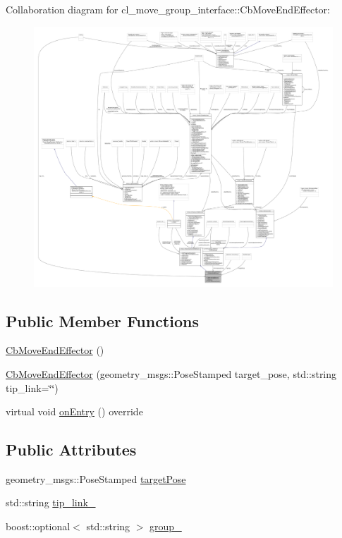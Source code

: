 Collaboration diagram for cl\+\_\+move\+\_\+group\+\_\+interface\+:\+:Cb\+Move\+End\+Effector\+:
\nopagebreak
\begin{figure}[H]
\begin{center}
\leavevmode
\includegraphics[width=350pt]{classcl__move__group__interface_1_1CbMoveEndEffector__coll__graph}
\end{center}
\end{figure}
\subsection*{Public Member Functions}
\begin{DoxyCompactItemize}
\item 
\hyperlink{classcl__move__group__interface_1_1CbMoveEndEffector_a5bcaaff082b7d8039a4f491b2797776e}{Cb\+Move\+End\+Effector} ()
\item 
\hyperlink{classcl__move__group__interface_1_1CbMoveEndEffector_a237d308fbeabd9c4bac82cf31b8fad33}{Cb\+Move\+End\+Effector} (geometry\+\_\+msgs\+::\+Pose\+Stamped target\+\_\+pose, std\+::string tip\+\_\+link=\char`\"{}\char`\"{})
\item 
virtual void \hyperlink{classcl__move__group__interface_1_1CbMoveEndEffector_a7e7c22ac6c5725bc95e9852c3f6d939d}{on\+Entry} () override
\end{DoxyCompactItemize}
\subsection*{Public Attributes}
\begin{DoxyCompactItemize}
\item 
geometry\+\_\+msgs\+::\+Pose\+Stamped \hyperlink{classcl__move__group__interface_1_1CbMoveEndEffector_ab0d0c060e52c6f09a6af727e6e954064}{target\+Pose}
\item 
std\+::string \hyperlink{classcl__move__group__interface_1_1CbMoveEndEffector_a4b6f4468b2db565a07119ac90c067436}{tip\+\_\+link\+\_\+}
\item 
boost\+::optional$<$ std\+::string $>$ \hyperlink{classcl__move__group__interface_1_1CbMoveEndEffector_a3060dbea1460d4d55ca73b95f4d17575}{group\+\_\+}
\end{DoxyCompactItemize}
